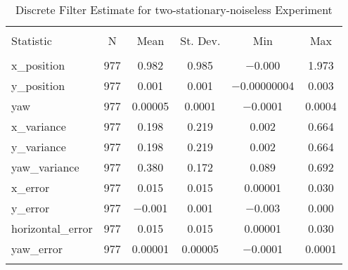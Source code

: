 
\begin{table}[h] \centering 
  \caption{Discrete Filter Estimate for two-stationary-noiseless Experiment} 
  \label{tab:two_stationary_noiseless_discrete_summary} 
\begin{tabular}{@{\extracolsep{5pt}}lccccc} 
\\[-1.8ex]\hline 
\hline \\[-1.8ex] 
Statistic & \multicolumn{1}{c}{N} & \multicolumn{1}{c}{Mean} & \multicolumn{1}{c}{St. Dev.} & \multicolumn{1}{c}{Min} & \multicolumn{1}{c}{Max} \\ 
\hline \\[-1.8ex] 
x\_position & 977 & 0.982 & 0.985 & $-$0.000 & 1.973 \\ 
y\_position & 977 & 0.001 & 0.001 & $-$0.00000004 & 0.003 \\ 
yaw & 977 & 0.00005 & 0.0001 & $-$0.0001 & 0.0004 \\ 
x\_variance & 977 & 0.198 & 0.219 & 0.002 & 0.664 \\ 
y\_variance & 977 & 0.198 & 0.219 & 0.002 & 0.664 \\ 
yaw\_variance & 977 & 0.380 & 0.172 & 0.089 & 0.692 \\ 
x\_error & 977 & 0.015 & 0.015 & 0.00001 & 0.030 \\ 
y\_error & 977 & $-$0.001 & 0.001 & $-$0.003 & 0.000 \\ 
horizontal\_error & 977 & 0.015 & 0.015 & 0.00001 & 0.030 \\ 
yaw\_error & 977 & 0.00001 & 0.00005 & $-$0.0001 & 0.0001 \\ 
\hline \\[-1.8ex] 
\end{tabular} 
\end{table} 
